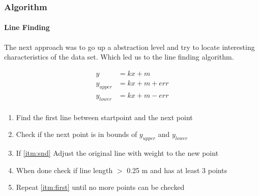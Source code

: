 \documentclass{beamer}
\begin{document}
\begin{frame}
\frametitle{Algorithm}
\framesubtitle{Line Finding}

The next approach was to go up a abstraction level and try to locate interesting characteristics of the data set.
Which led us to the line finding algorithm.
\pause

\begin{equation} \label{eq1}
\begin{split}
y & = kx + m \\
y_{upper}  & =  kx + m + err \\
y_{lower} & = kx + m - err \\
\end{split}
\end{equation}
\begin{enumerate}
\pause
\item{\label{itm:first}Find the first line between startpoint and the next point}
\item{\label{itm:snd}Check if the next point is in bounds of $y_{upper}$ and $y_{lower}$}
\item{If \ref{itm:snd} Adjust the original line with weight to the new point}
\item{When done check if line length $>$ 0.25 m and has at least 3 points}
\item{Repeat \ref{itm:first} until no more points can be checked}
\end{enumerate}


\end{frame}
\end{document}
